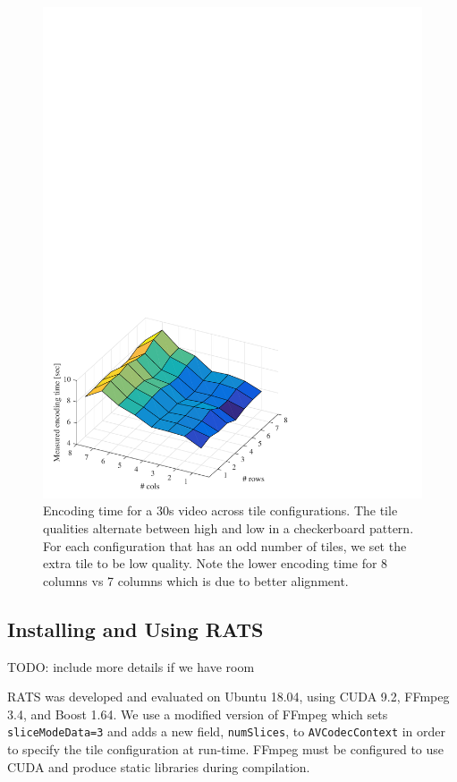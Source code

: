 \begin{figure}[t]
	\includegraphics[width=\columnwidth]{figures/times_v1.pdf}
	\caption{Encoding time for a 30s video across tile configurations. The tile qualities alternate between high and low in a checkerboard pattern. For each configuration that has an odd number of tiles, we set the extra tile to be low quality. Note the lower encoding time for 8 columns vs 7 columns which is due to better alignment.}
	\label{fig:time}
\end{figure}

\subsection{Installing and Using RATS}

TODO: include more details if we have room

RATS was developed and evaluated on Ubuntu 18.04, using CUDA 9.2, FFmpeg 3.4, and Boost 1.64. We use a modified version of FFmpeg which sets \texttt{sliceModeData=3} and adds a new field, \texttt{numSlices}, to \texttt{AVCodecContext} in order to specify the tile configuration at run-time. FFmpeg must be configured to use CUDA and produce static libraries during compilation.

